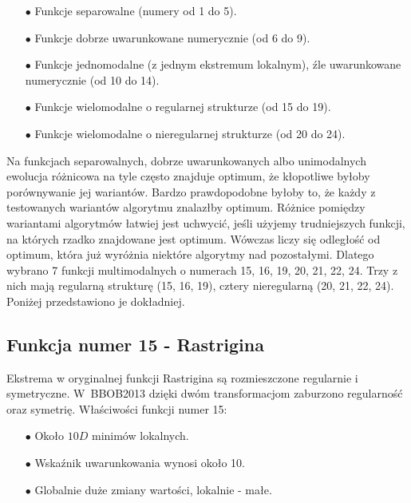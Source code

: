 \documentclass[a4paper,onecolumn,oneside,11pt,wide,floatssmall]{mwrep}
\theoremstyle{definition}
\theoremstyle{plain}%
\theoremstyle{remark}
\begin{document}
\begin{itemize}
 \item[$\bullet$] Funkcje separowalne (numery od 1 do 5).
 \item[$\bullet$] Funkcje dobrze uwarunkowane numerycznie (od 6 do 9).
 \item[$\bullet$] Funkcje jednomodalne (z jednym ekstremum lokalnym), źle uwarunkowane numerycznie (od 10 do 14).
 \item[$\bullet$] Funkcje wielomodalne o regularnej strukturze (od 15 do 19).
 \item[$\bullet$] Funkcje wielomodalne o nieregularnej strukturze (od 20 do 24).
\end{itemize} 

Na funkcjach separowalnych, dobrze uwarunkowanych albo unimodalnych ewolucja różnicowa na tyle często znajduje optimum, że kłopotliwe
byłoby porównywanie jej wariantów. Bardzo prawdopodobne byłoby to, że każdy z testowanych wariantów algorytmu znalazłby optimum. 
Różnice pomiędzy wariantami algorytmów łatwiej jest uchwycić, jeśli użyjemy trudniejszych funkcji, na których rzadko znajdowane jest 
optimum. Wówczas liczy się odległość od optimum, która już wyróżnia niektóre algorytmy nad pozostałymi. Dlatego wybrano 7 funkcji 
multimodalnych o numerach 15, 16, 19, 20, 21, 22, 24. Trzy z nich mają regularną strukturę (15, 16, 19), cztery nieregularną (20, 21, 22, 24).
Poniżej przedstawiono je dokładniej.

\subsection{Funkcja numer 15 - Rastrigina}

Ekstrema w oryginalnej funkcji Rastrigina są rozmieszczone regularnie i symetryczne. W~BBOB2013 dzięki dwóm transformacjom
zaburzono regularność oraz symetrię. Właściwości funkcji numer 15: 
\begin{itemize}
 \item[$\bullet$] Około $10D$ minimów lokalnych.
 \item[$\bullet$] Wskaźnik uwarunkowania wynosi około 10.
 \item[$\bullet$] Globalnie duże zmiany wartości, lokalnie - małe.
\end{itemize} 
\end{document}
